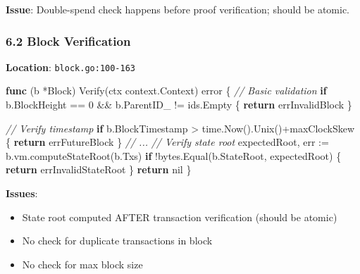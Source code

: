 \documentclass[
]{article}
\newenvironment{Shaded}{}{}
\newcommand{\CommentTok}[1]{\textcolor[rgb]{0.38,0.63,0.69}{\textit{#1}}}
\newcommand{\ControlFlowTok}[1]{\textcolor[rgb]{0.00,0.44,0.13}{\textbf{#1}}}
\newcommand{\DataTypeTok}[1]{\textcolor[rgb]{0.56,0.13,0.00}{#1}}
\newcommand{\DecValTok}[1]{\textcolor[rgb]{0.25,0.63,0.44}{#1}}
\newcommand{\KeywordTok}[1]{\textcolor[rgb]{0.00,0.44,0.13}{\textbf{#1}}}
\newcommand{\NormalTok}[1]{#1}
\newcommand{\OperatorTok}[1]{\textcolor[rgb]{0.40,0.40,0.40}{#1}}
\newcommand{\OtherTok}[1]{\textcolor[rgb]{0.00,0.44,0.13}{#1}}
\providecommand{\tightlist}{%
  \setlength{\itemsep}{0pt}\setlength{\parskip}{0pt}}
\begin{document}
\textbf{Issue}: Double-spend check happens before proof verification;
should be atomic.

\subsubsection{6.2 Block Verification}\label{62-block-verification}

\textbf{Location}: \texttt{block.go:100-163}

\begin{Shaded}
\begin{Highlighting}[]
\KeywordTok{func} \OperatorTok{(}\NormalTok{b }\OperatorTok{*}\NormalTok{Block}\OperatorTok{)}\NormalTok{ Verify}\OperatorTok{(}\NormalTok{ctx context}\OperatorTok{.}\NormalTok{Context}\OperatorTok{)} \DataTypeTok{error} \OperatorTok{\{}
    \CommentTok{// Basic validation}
    \ControlFlowTok{if}\NormalTok{ b}\OperatorTok{.}\NormalTok{BlockHeight }\OperatorTok{==} \DecValTok{0} \OperatorTok{\&\&}\NormalTok{ b}\OperatorTok{.}\NormalTok{ParentID\_ }\OperatorTok{!=}\NormalTok{ ids}\OperatorTok{.}\NormalTok{Empty }\OperatorTok{\{}
        \ControlFlowTok{return}\NormalTok{ errInvalidBlock}
    \OperatorTok{\}}
    
    \CommentTok{// Verify timestamp}
    \ControlFlowTok{if}\NormalTok{ b}\OperatorTok{.}\NormalTok{BlockTimestamp }\OperatorTok{\textgreater{}}\NormalTok{ time}\OperatorTok{.}\NormalTok{Now}\OperatorTok{().}\NormalTok{Unix}\OperatorTok{()+}\NormalTok{maxClockSkew }\OperatorTok{\{}
        \ControlFlowTok{return}\NormalTok{ errFutureBlock}
    \OperatorTok{\}}
    \CommentTok{// ...}
    \CommentTok{// Verify state root}
\NormalTok{    expectedRoot}\OperatorTok{,}\NormalTok{ err }\OperatorTok{:=}\NormalTok{ b}\OperatorTok{.}\NormalTok{vm}\OperatorTok{.}\NormalTok{computeStateRoot}\OperatorTok{(}\NormalTok{b}\OperatorTok{.}\NormalTok{Txs}\OperatorTok{)}
    \ControlFlowTok{if} \OperatorTok{!}\NormalTok{bytes}\OperatorTok{.}\NormalTok{Equal}\OperatorTok{(}\NormalTok{b}\OperatorTok{.}\NormalTok{StateRoot}\OperatorTok{,}\NormalTok{ expectedRoot}\OperatorTok{)} \OperatorTok{\{}
        \ControlFlowTok{return}\NormalTok{ errInvalidStateRoot}
    \OperatorTok{\}}
    \ControlFlowTok{return} \OtherTok{nil}
\OperatorTok{\}}
\end{Highlighting}
\end{Shaded}

\textbf{Issues}:

\begin{itemize}
\tightlist
\item
  State root computed AFTER transaction verification (should be atomic)
\item
  No check for duplicate transactions in block
\item
  No check for max block size
\end{itemize}
\end{document}
